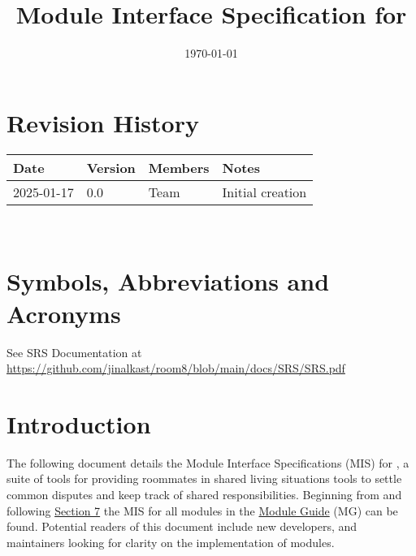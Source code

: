 \documentclass[12pt, titlepage]{article}
\begin{document}
\title{Module Interface Specification for \progname{}}

\author{\authname}

\date{\today}

\maketitle


\section{Revision History}

\begin{tabularx}{\textwidth}{p{3cm}p{2cm}p{4cm}X}
\toprule {\bf Date} & {\bf Version} & {\bf Members} & {\bf Notes}\\
\midrule
2025-01-17 & 0.0 & Team & Initial creation\\
\bottomrule
\end{tabularx}

~\newpage

\section{Symbols, Abbreviations and Acronyms}

See SRS Documentation at \url{https://github.com/jinalkast/room8/blob/main/docs/SRS/SRS.pdf}

\newpage

\tableofcontents

\newpage


\section{Introduction}

The following document details the Module Interface Specifications (MIS) for
\progname{}, a suite of tools for providing roommates in shared living situations tools to settle common disputes and keep track of shared responsibilities. Beginning from and following \hyperref[Start]{Section 7} the MIS for all modules in the \href{https://github.com/jinalkast/room8/tree/main/docs/Design/SoftArchitecture}{Module Guide} (MG) can be found. Potential readers of this document include new developers, and maintainers looking for clarity on the implementation of modules.\\
\end{document}
